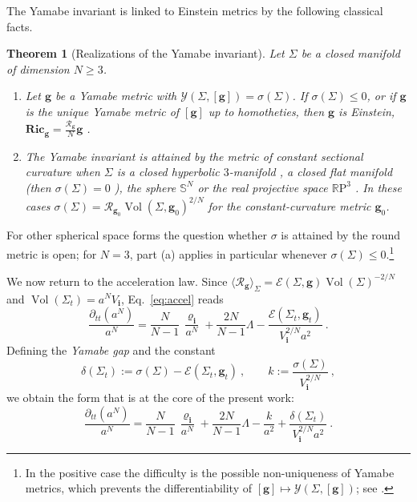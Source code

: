 \documentclass[aps,prd,reprint,amsmath,amssymb,nofootinbib,longbibliography]{revtex4-2}
\DeclareMathOperator{\Vol}{Vol}
\newcommand{\RR}{\mathbb{R}}
\newcommand{\Sph}{\mathbb{S}}
\newcommand{\g}{\mathbf{g}}                 %
\newcommand{\Rs}{\mathcal{R}}               %
\newcommand{\Ric}{\mathbf{Ric}}             %
\newcommand{\ini}[1]{{#1}_{\mathbf{i}}}     %
\newcommand{\inirho}{\ini{\varrho}}
\newcommand{\EH}{\mathcal{E}}               %
\newcommand{\Y}{\mathcal{Y}}                %
\theoremstyle{plain}
\newtheorem{theorem}{Theorem}
\theoremstyle{definition}
\theoremstyle{remark}
\begin{document}
The Yamabe invariant is linked to Einstein metrics by the following classical facts.

\begin{theorem}[Realizations of the Yamabe invariant]
\label{thm:extremal}
Let $\Sigma$ be a closed manifold of dimension $N\geq 3$.
\begin{enumerate}
\item[(a)] Let $\g$ be a Yamabe metric with $\Y(\Sigma,[\g])=\sigma(\Sigma)$. If $\sigma(\Sigma)\le0$, or if $\g$ is the unique Yamabe metric of $[\g]$ up to homotheties, then $\g$ is Einstein, $\Ric_\g=\frac{\Rs_\g}{N}\g$ \cite{Schoen1989,MR867684,Anderson2005}.
\item[(b)] The Yamabe invariant is attained by the metric of constant sectional curvature when $\Sigma$ is a closed hyperbolic $3$-manifold \cite{MR2213687}, a closed flat manifold (then $\sigma(\Sigma)=0$ \cite{MR569070}), the sphere $\Sph^N$ \cite{MR448404,Obata1971} or the real projective space $\RR\mathrm{P}^3$ \cite{BrayNeves2004,MR2081443}. In these cases $\sigma(\Sigma)=\Rs_{\g_0}\Vol(\Sigma,\g_0)^{2/N}$ for the constant-curvature metric $\g_0$.
\end{enumerate}
\end{theorem}

For other spherical space forms the question whether $\sigma$ is attained by the round metric is open; for $N=3$, part (a) applies in particular whenever $\sigma(\Sigma)\le0$.\footnote{In the positive case the difficulty is the possible non-uniqueness of Yamabe metrics, which prevents the differentiability of $[\g]\mapsto\Y(\Sigma,[\g])$; see \cite{Anderson2005}.}

We now return to the acceleration law. Since $\langle\Rs_\g\rangle_\Sigma=\EH(\Sigma,\g)\Vol(\Sigma)^{-2/N}$ and $\Vol(\Sigma_t)=a^N\ini V$, Eq.~\eqref{eq:accel} reads
\begin{equation}
\label{eq:accel-yamabe}
\frac{\partial_{tt} (a^N)}{a^N} = \frac{N}{N-1}\, \frac{\inirho}{a^N} + \frac{2N}{N-1}\Lambda - \frac{\EH(\Sigma_t,\g_t)}{\ini V^{2/N}a^2}\ .
\end{equation}
Defining the \emph{Yamabe gap} and the constant
\begin{equation}
\label{eq:gap-def}
\delta(\Sigma_t) := \sigma(\Sigma)-\EH(\Sigma_t,\g_t)\ ,\qquad k:=\frac{\sigma(\Sigma)}{\ini V^{2/N}}\ ,
\end{equation}
we obtain the form that is at the core of the present work:
\begin{equation}
\label{eq:accel-gap}
\frac{\partial_{tt} (a^N)}{a^N} = \frac{N}{N-1}\, \frac{\inirho}{a^N} + \frac{2N}{N-1}\Lambda - \frac{k}{a^2} + \frac{\delta(\Sigma_t)}{\ini V^{2/N}a^2}\ .
\end{equation}
\end{document}
